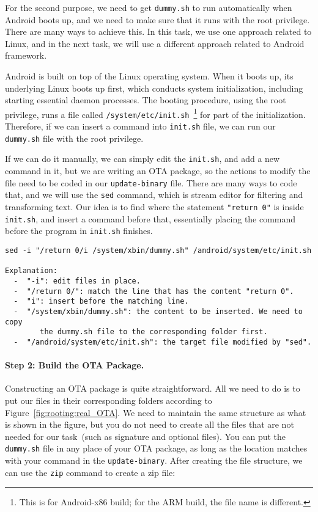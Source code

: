 For the second purpose, we need to get \texttt{dummy.sh} to run
automatically when Android boots up, and we need to make sure that it runs
with the root privilege. There are many ways to achieve this. In this task,
we use one approach related to Linux, and in the next task, we will use a different
approach related to Android framework.

Android is built on top of the Linux operating system. When it boots
up, its underlying Linux boots up first, which conducts system
initialization, including starting essential daemon processes.  
The booting procedure, using the root privilege, runs a file called 
\texttt{/system/etc/init.sh}~\footnote{This is
for Android-x86 build; for the ARM build, the file name is different.} 
for part of the initialization. Therefore, if we can insert a command 
into \texttt{init.sh} file, we can run our \texttt{dummy.sh} file with the
root privilege. 

If we can do it manually, we can simply edit the \texttt{init.sh}, and add
a new command in it, but we are writing an OTA package, so the actions
to modify the file need to be coded in our \texttt{update-binary}
file. There are many ways to code that, and we will use the \texttt{sed}
command, which is stream editor for filtering and transforming text. 
Our idea is to find where the statement \texttt{"return 0"} is inside \texttt{init.sh},
and insert a command before that, essentially placing the command before 
the program in \texttt{init.sh} finishes.  

\begin{lstlisting}[frame=single, caption={}, label=label]
sed -i "/return 0/i /system/xbin/dummy.sh" /android/system/etc/init.sh

Explanation: 
  -  "-i": edit files in place.
  -  "/return 0/": match the line that has the content "return 0".
  -  "i": insert before the matching line.
  -  "/system/xbin/dummy.sh": the content to be inserted. We need to copy
        the dummy.sh file to the corresponding folder first.
  -  "/android/system/etc/init.sh": the target file modified by "sed".
\end{lstlisting}


\paragraph{Step 2: Build the OTA Package.}
Constructing an OTA package is quite straightforward. All we need to do is to put our files in
their corresponding folders according to Figure~\ref{fig:rooting:real_OTA}.
We need to maintain the same structure as what is shown in the figure, but 
you do not need to create all the files that are not needed for our 
task~(such as signature and optional files). 
You can put the \texttt{dummy.sh} file in any place of your 
OTA package, as long as the location matches with your command in 
the \texttt{update-binary}. After creating the file structure, we can use
the \texttt{zip} command to create a zip file:

